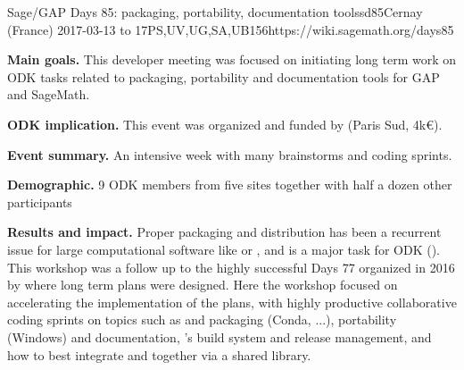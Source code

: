 \begin{event}{Sage/GAP Days 85: packaging, portability, documentation tools}{sd85}{Cernay (France) 2017-03-13 to 17}{PS,UV,UG,SA,UB}{15}{6}{https://wiki.sagemath.org/days85}

  \textbf{Main goals.} This developer meeting was focused on
  initiating long term work on ODK tasks related to packaging,
  portability and documentation tools for GAP and SageMath.

  \textbf{ODK implication.} This event was organized and funded by
  \ODK (Paris Sud, \approx 4k€).

  \textbf{Event summary.} An intensive week with many brainstorms and coding sprints.

  \textbf{Demographic.} 9 ODK members from five sites together with
  half a dozen other participants

  \textbf{Results and impact.} Proper packaging and distribution has
  been a recurrent issue for large computational software like \Sage
  or \GAP, and is a major task for ODK
  (). This workshop
  was a follow up to the highly successful \Sage Days 77 organized in
  2016 by \ODK where long term plans were designed. Here the workshop
  focused on accelerating the implementation of the plans, with highly
  productive collaborative coding sprints on topics such as \GAP and
  \Sage packaging (Conda, ...), \Sage portability (Windows) and
  documentation, \GAP's build system and release management, and how
  to best integrate \GAP and \Sage together via a shared library.
\end{event}
